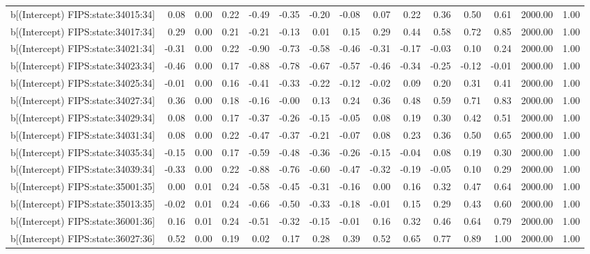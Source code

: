 \begin{table}[ht]
\begin{tabular}{rrrrrrrrrrrrrrr}
  b[(Intercept) FIPS:state:34015:34] & 0.08 & 0.00 & 0.22 & -0.49 & -0.35 & -0.20 & -0.08 & 0.07 & 0.22 & 0.36 & 0.50 & 0.61 & 2000.00 & 1.00 \\ 
  b[(Intercept) FIPS:state:34017:34] & 0.29 & 0.00 & 0.21 & -0.21 & -0.13 & 0.01 & 0.15 & 0.29 & 0.44 & 0.58 & 0.72 & 0.85 & 2000.00 & 1.00 \\ 
  b[(Intercept) FIPS:state:34021:34] & -0.31 & 0.00 & 0.22 & -0.90 & -0.73 & -0.58 & -0.46 & -0.31 & -0.17 & -0.03 & 0.10 & 0.24 & 2000.00 & 1.00 \\ 
  b[(Intercept) FIPS:state:34023:34] & -0.46 & 0.00 & 0.17 & -0.88 & -0.78 & -0.67 & -0.57 & -0.46 & -0.34 & -0.25 & -0.12 & -0.01 & 2000.00 & 1.00 \\ 
  b[(Intercept) FIPS:state:34025:34] & -0.01 & 0.00 & 0.16 & -0.41 & -0.33 & -0.22 & -0.12 & -0.02 & 0.09 & 0.20 & 0.31 & 0.41 & 2000.00 & 1.00 \\ 
  b[(Intercept) FIPS:state:34027:34] & 0.36 & 0.00 & 0.18 & -0.16 & -0.00 & 0.13 & 0.24 & 0.36 & 0.48 & 0.59 & 0.71 & 0.83 & 2000.00 & 1.00 \\ 
  b[(Intercept) FIPS:state:34029:34] & 0.08 & 0.00 & 0.17 & -0.37 & -0.26 & -0.15 & -0.05 & 0.08 & 0.19 & 0.30 & 0.42 & 0.51 & 2000.00 & 1.00 \\ 
  b[(Intercept) FIPS:state:34031:34] & 0.08 & 0.00 & 0.22 & -0.47 & -0.37 & -0.21 & -0.07 & 0.08 & 0.23 & 0.36 & 0.50 & 0.65 & 2000.00 & 1.00 \\ 
  b[(Intercept) FIPS:state:34035:34] & -0.15 & 0.00 & 0.17 & -0.59 & -0.48 & -0.36 & -0.26 & -0.15 & -0.04 & 0.08 & 0.19 & 0.30 & 2000.00 & 1.00 \\ 
  b[(Intercept) FIPS:state:34039:34] & -0.33 & 0.00 & 0.22 & -0.88 & -0.76 & -0.60 & -0.47 & -0.32 & -0.19 & -0.05 & 0.10 & 0.29 & 2000.00 & 1.00 \\ 
  b[(Intercept) FIPS:state:35001:35] & 0.00 & 0.01 & 0.24 & -0.58 & -0.45 & -0.31 & -0.16 & 0.00 & 0.16 & 0.32 & 0.47 & 0.64 & 2000.00 & 1.00 \\ 
  b[(Intercept) FIPS:state:35013:35] & -0.02 & 0.01 & 0.24 & -0.66 & -0.50 & -0.33 & -0.18 & -0.01 & 0.15 & 0.29 & 0.43 & 0.60 & 2000.00 & 1.00 \\ 
  b[(Intercept) FIPS:state:36001:36] & 0.16 & 0.01 & 0.24 & -0.51 & -0.32 & -0.15 & -0.01 & 0.16 & 0.32 & 0.46 & 0.64 & 0.79 & 2000.00 & 1.00 \\ 
  b[(Intercept) FIPS:state:36027:36] & 0.52 & 0.00 & 0.19 & 0.02 & 0.17 & 0.28 & 0.39 & 0.52 & 0.65 & 0.77 & 0.89 & 1.00 & 2000.00 & 1.00 \\ 

\end{tabular}
\end{table}
